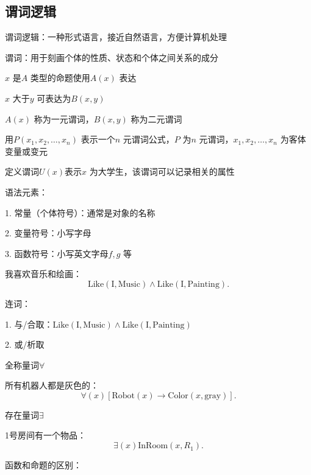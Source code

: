 \subsection{谓词逻辑}%
\label{sub:谓词逻辑}
\begin{defi}
	谓词逻辑：一种形式语言，接近自然语言，方便计算机处理
\end{defi}
谓词：用于刻画个体的性质、状态和个体之间关系的成分
\begin{eg}
	$x$ 是$A$ 类型的命题使用$A\left( x \right) $ 表达

	$x$ 大于$y$ 可表达为$B\left( x,y \right) $ 

	$A\left( x \right) $ 称为一元谓词，$B\left( x,y \right) $ 称为二元谓词

	用$P\left( x_1,x_2,\ldots,x_{n} \right) $ 表示一个$n$ 元谓词公式，$P$ 为$n$ 元谓词，$x_1,x_2,\ldots,x_{n}$ 为客体变量或变元

	定义谓词$U\left( x \right) $表示$x$ 为大学生，该谓词可以记录相关的属性
\end{eg}
语法元素：

1. 常量（个体符号）：通常是对象的名称

2. 变量符号：小写字母

3. 函数符号：小写英文字母$f,g$ 等

\begin{eg}
	我喜欢音乐和绘画：
	\[
		\text{Like}\left( \text{I},\text{Music} \right) \land \text{Like}\left( \text{I},\text{Painting} \right) 
	.\] 
\end{eg}
连词：

1. 与/合取：$\text{Like}\left( \text{I},\text{Music} \right) \land \text{Like}\left( \text{I},\text{Painting} \right) $ 

2. 或/析取

\begin{notation}
	全称量词$\forall $ 
	
	\begin{eg}
		所有机器人都是灰色的：
		\[
			\forall \left( x \right) [\text{Robot}\left( x \right) \to \text{Color}\left( x,\text{gray} \right) ]
		.\] 
	\end{eg}
	
\end{notation}
\begin{notation}
	存在量词$\exists $ 
	\begin{eg}
		1号房间有一个物品：
		\[
			\exists \left( x \right) \text{InRoom}\left( x,R_1 \right) 
		.\] 
	\end{eg}
	
\end{notation}
函数和命题的区别：

